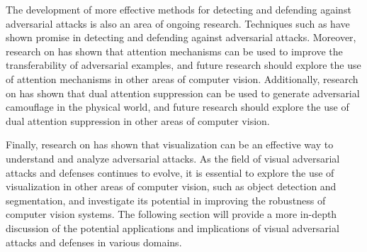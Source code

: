 \documentclass[11pt]{article}
\begin{document}
The development of more effective methods for detecting and defending against adversarial attacks is also an area of ongoing research. Techniques such as \cite{ref168} have shown promise in detecting and defending against adversarial attacks. Moreover, research on \cite{ref24} has shown that attention mechanisms can be used to improve the transferability of adversarial examples, and future research should explore the use of attention mechanisms in other areas of computer vision. Additionally, research on \cite{ref183} has shown that dual attention suppression can be used to generate adversarial camouflage in the physical world, and future research should explore the use of dual attention suppression in other areas of computer vision.

Finally, research on \cite{ref184} has shown that visualization can be an effective way to understand and analyze adversarial attacks. As the field of visual adversarial attacks and defenses continues to evolve, it is essential to explore the use of visualization in other areas of computer vision, such as object detection and segmentation, and investigate its potential in improving the robustness of computer vision systems. The following section will provide a more in-depth discussion of the potential applications and implications of visual adversarial attacks and defenses in various domains.
\end{document}
